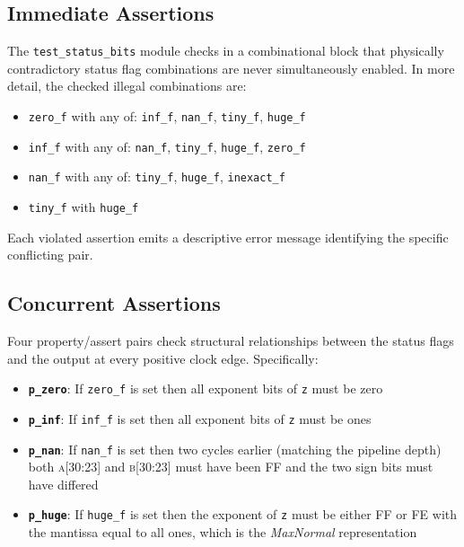 \documentclass[12pt]{report}
\begin{document}
\subsection{Immediate Assertions}
The \lstinline{test_status_bits} module checks in a combinational block that physically contradictory status flag combinations are never simultaneously enabled. In more detail, the checked illegal combinations are:

\begin{itemize}
\item \lstinline{zero_f} with any of: \lstinline{inf_f}, \lstinline{nan_f}, \lstinline{tiny_f}, \lstinline{huge_f}
\item \lstinline{inf_f} with any of: \lstinline{nan_f}, \lstinline{tiny_f}, \lstinline{huge_f}, \lstinline{zero_f}
\item \lstinline{nan_f} with any of: \lstinline{tiny_f}, \lstinline{huge_f}, \lstinline{inexact_f}
\item \lstinline{tiny_f} with \lstinline{huge_f}
\end{itemize}

\noindent Each violated assertion emits a descriptive error message identifying the specific conflicting pair.

\subsection{Concurrent Assertions}
Four property/assert pairs check structural relationships between the status flags and the output at every positive clock edge. Specifically:

\begin{itemize}
\item \textbf{\lstinline{p_zero}}: If \lstinline{zero_f} is set then all exponent bits of \lstinline{z} must be zero
\item \textbf{\lstinline{p_inf}}: If \lstinline{inf_f} is set then all exponent bits of \lstinline{z} must be ones
\item \textbf{\lstinline{p_nan}}: If \lstinline{nan_f} is set then two cycles earlier (matching the pipeline depth) both \textsc{a[30:23]} and \textsc{b[30:23]} must have been \textsc{FF} and the two sign bits must have differed
\item \textbf{\lstinline{p_huge}}: If \lstinline{huge_f} is set then the exponent of \lstinline{z} must be either \textsc{FF} or \textsc{FE} with the mantissa equal to all ones,  which is the \textit{MaxNormal} representation
\end{itemize}
\end{document}

